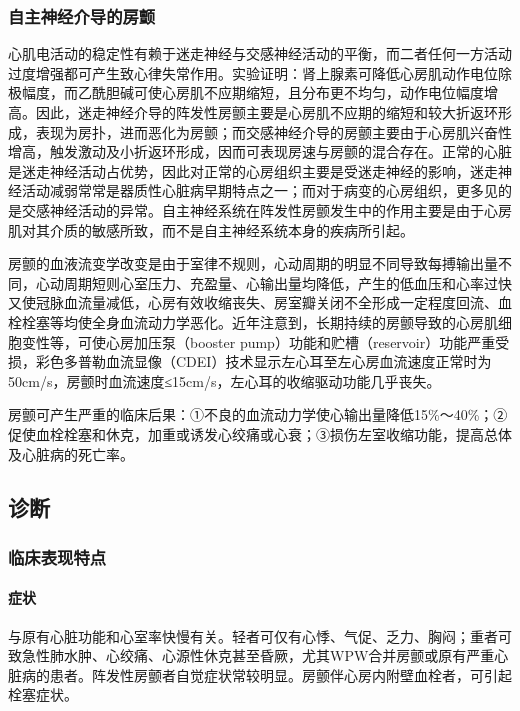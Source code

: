 \subsubsection{自主神经介导的房颤}

心肌电活动的稳定性有赖于迷走神经与交感神经活动的平衡，而二者任何一方活动过度增强都可产生致心律失常作用。实验证明：肾上腺素可降低心房肌动作电位除极幅度，而乙酰胆碱可使心房肌不应期缩短，且分布更不均匀，动作电位幅度增高。因此，迷走神经介导的阵发性房颤主要是心房肌不应期的缩短和较大折返环形成，表现为房扑，进而恶化为房颤；而交感神经介导的房颤主要由于心房肌兴奋性增高，触发激动及小折返环形成，因而可表现房速与房颤的混合存在。正常的心脏是迷走神经活动占优势，因此对正常的心房组织主要是受迷走神经的影响，迷走神经活动减弱常常是器质性心脏病早期特点之一；而对于病变的心房组织，更多见的是交感神经活动的异常。自主神经系统在阵发性房颤发生中的作用主要是由于心房肌对其介质的敏感所致，而不是自主神经系统本身的疾病所引起。

房颤的血液流变学改变是由于室律不规则，心动周期的明显不同导致每搏输出量不同，心动周期短则心室压力、充盈量、心输出量均降低，产生的低血压和心率过快又使冠脉血流量减低，心房有效收缩丧失、房室瓣关闭不全形成一定程度回流、血栓栓塞等均使全身血流动力学恶化。近年注意到，长期持续的房颤导致的心房肌细胞变性等，可使心房加压泵（booster
pump）功能和贮槽（reservoir）功能严重受损，彩色多普勒血流显像（CDEI）技术显示左心耳至左心房血流速度正常时为50cm/s，房颤时血流速度≤15cm/s，左心耳的收缩驱动功能几乎丧失。

房颤可产生严重的临床后果：①不良的血流动力学使心输出量降低15\%～40\%；②促使血栓栓塞和休克，加重或诱发心绞痛或心衰；③损伤左室收缩功能，提高总体及心脏病的死亡率。

\subsection{诊断}

\subsubsection{临床表现特点}

\paragraph{症状}

与原有心脏功能和心室率快慢有关。轻者可仅有心悸、气促、乏力、胸闷；重者可致急性肺水肿、心绞痛、心源性休克甚至昏厥，尤其WPW合并房颤或原有严重心脏病的患者。阵发性房颤者自觉症状常较明显。房颤伴心房内附壁血栓者，可引起栓塞症状。

